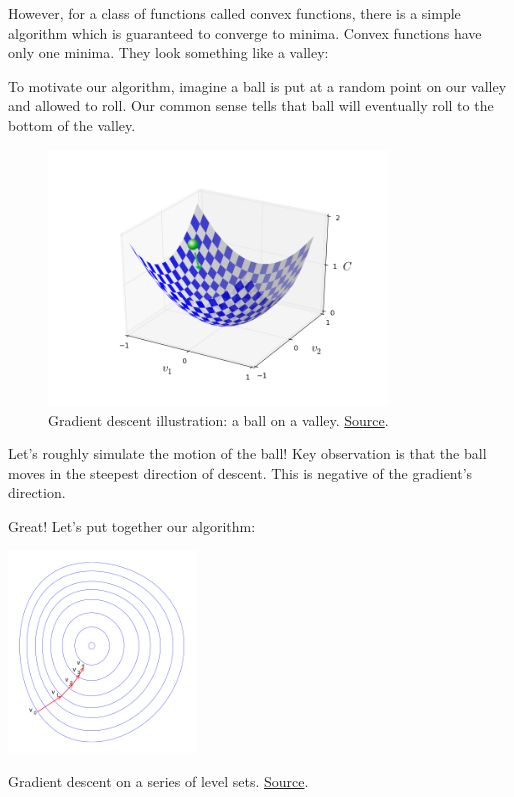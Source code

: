 \documentclass[a4paper]{tufte-handout}
\begin{document}
However, for a class of functions called convex functions, there is a
simple algorithm which is guaranteed to converge to minima. Convex
functions have only one minima. They look something like a valley:

To motivate our algorithm, imagine a ball
is put at a random point on our valley and allowed to roll. Our common
sense tells that ball will eventually roll to the bottom of the valley.

\begin{figure}
  \includegraphics[width=90mm]{valley_with_ball}
  \caption{Gradient descent illustration: a ball on a valley.
\href{http://neuralnetworksanddeeplearning.com/chap1.html}{Source}.}
\end{figure}

Let's roughly simulate the motion of the ball! Key observation is that
the ball moves in the steepest direction of descent. This is negative
of the gradient's direction.

Great! Let's put together our algorithm:

\begin{marginfigure}
  \includegraphics[width=50mm]{Gradient_descent}
  \caption{Gradient descent on a series of level sets.
  \href{https://en.wikipedia.org/wiki/Gradient_descent}{Source}.}
\end{marginfigure}
\end{document}
